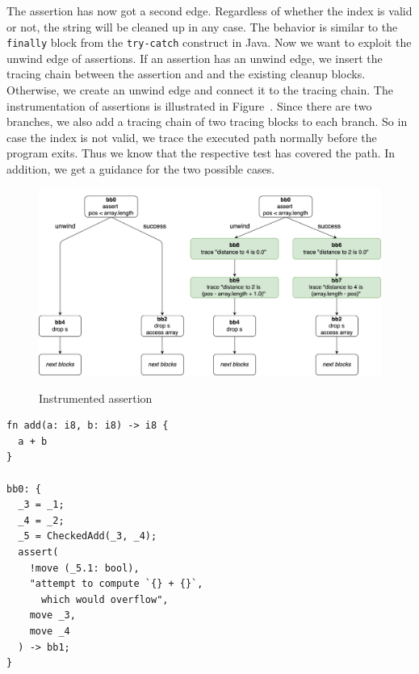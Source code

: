 \documentclass[paper=a4,%
  twoside,%
  BCOR4mm,%
  abstract=true,%
  toc=bibliography,%
  chapterprefix=true,%
  toc=bibliographynumbered,%
  open=right,%
  english,%
  pagesize=pdftex]{scrreprt}
\begin{document}
The assertion has now got a second edge. Regardless of whether the index is valid or not, the string will be cleaned up in any case. The behavior is similar to the \lstinline{finally} block from the \lstinline{try-catch} construct in Java. Now we want to exploit the unwind edge of assertions. If an assertion has an unwind edge, we insert the tracing chain between the assertion and and the existing cleanup blocks. Otherwise, we create an unwind edge and connect it to the tracing chain. The instrumentation of assertions is illustrated in Figure~. Since there are two branches, we also add a tracing chain of two tracing blocks to each branch. So in case the index is not valid, we trace the executed path normally before the program exits. Thus we know that the respective test has covered the path. In addition, we get a guidance for the two possible cases.

\begin{figure}[h]
\caption{Instrumented assertion}
\centering
\includegraphics[width=\textwidth]{comparison-instrumented-assertion}
\label{fig:comparison-instrumented-assertion}
\end{figure}

\begin{lstlisting}[language={}, style=boxed, caption={\ac{MIR} overflow check}, label=lst:mir-overflow-check]
fn add(a: i8, b: i8) -> i8 {
  a + b
}

bb0: {
  _3 = _1;
  _4 = _2;
  _5 = CheckedAdd(_3, _4);
  assert(
    !move (_5.1: bool),
    "attempt to compute `{} + {}`,
      which would overflow",
    move _3,
    move _4
  ) -> bb1;
}
\end{lstlisting}

\end{document}
